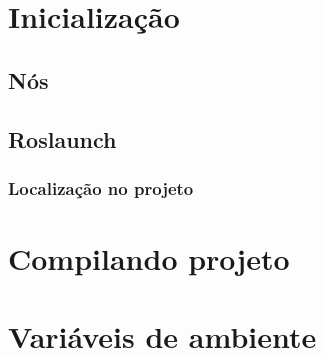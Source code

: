 \chapter{Inicialização}

\section{Nós}

\section{Roslaunch}

\subsection{Localização no projeto}

\chapter{Compilando projeto}

\chapter{Variáveis de ambiente}

